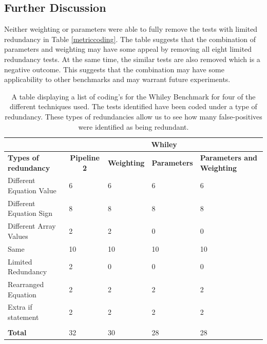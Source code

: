 \subsection{Further Discussion}

Neither weighting or parameters were able to fully remove the tests with limited redundancy in Table \ref{metriccoding}. The table suggests that the combination of parameters and weighting may have some appeal by removing all eight limited redundancy tests. At the same time, the similar tests are also removed which is a negative outcome. This suggests that the combination may have some applicability to other benchmarks and may warrant future experiments.

\begin{table}[h]
\centering

\begin{tabular}{|l|l|l|l|l|}
\hline
                          & \multicolumn{4}{c|}{{\bf Whiley}}                                                             \\ \hline
{\bf Types of redundancy} & \multicolumn{1}{c|}{{\bf Pipeline 2}} & {\bf Weighting} & {\bf Parameters} & {\bf Parameters and Weighting} \\ \hline
Different Equation Value  & 6                                     & 6               & 6                & 6                \\ \hline
Different Equation Sign   & 8                                     & 8               & 8                & 8                \\ \hline
Different Array Values    & 2                                     & 2               & 0                & 0                \\ \hline
Same                      & 10                                    & 10              & 10               & 10               \\ \hline
Limited Redundancy        & 2                                     & 0               & 0                & 0                \\ \hline
Rearranged Equation       & 2                                     & 2               & 2                & 2                \\ \hline
Extra if statement        & 2                                     & 2               & 2                & 2                \\ \hline
                          &                                       &                 &                  &                  \\ \hline
{\bf Total}               & 32                                    & 30              & 28               & 28               \\ \hline
\end{tabular}
\caption[A table displaying a list of coding's for the Whiley Benchmark for four of the different techniques used]{A table displaying a list of coding's for the Whiley Benchmark for four of the different techniques used. The tests identified have been coded under a type of redundancy. These types of redundancies allow us to see how many false-positives were identified as being redundant. }
\label{whileycoding}
\end{table}


